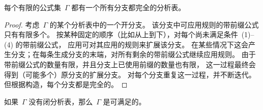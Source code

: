 \documentclass[../../../include/open-logic-section]{subfiles}
\begin{document}
\begin{prop}
  每个有限的公式集~$\Gamma$ 都有一个所有分支都完全的分析表。
\end{prop}

\begin{proof}
  考虑~$\Gamma$ 的某个分析表中的一个开分支。
  该分支中可应用规则的带前缀公式只有有限多个。
  按某种固定的顺序（比如从上到下），对每个尚未满足条件~(1)--(4) 的带前缀公式，
  应用可对其应用的规则来扩展该分支。
  在某些情况下这会产生分支；在每条生成分支的末端，对所有剩余的带前缀公式继续应用规则。
  由于带前缀公式的数量有限，并且分支上已使用前缀的数量也有限，
  这一过程最终会得到（可能多个）原分支的扩展分支。
  对每个分支重复这一过程，并不断迭代。
  但根据构造，每个分支都是完全的。
\end{proof}

\begin{thm}[完备性]
  如果~$\Gamma$ 没有闭分析表，那么~$\Gamma$ 是可满足的。
\end{thm}
\end{document}
